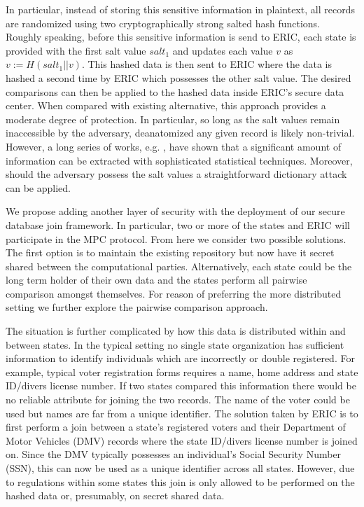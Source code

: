 In particular, instead of storing this sensitive information in plaintext, all records are randomized using two cryptographically strong salted hash functions. Roughly speaking, before this sensitive information is send to ERIC, each state is provided with the first salt value $salt_1$ and updates each value $v$ as $v := H(salt_1 || v)$. This hashed data is then sent to ERIC where the data is hashed a second time by ERIC which possesses the other salt value. The desired comparisons can then be applied to the hashed data inside ERIC's secure data center. When compared with existing alternative, this approach provides a moderate degree of protection. In particular, so long as the salt values remain inaccessible by the adversary, deanatomized any given record is likely non-trivial. However, a long series of works, e.g. \cite{deanon0,deanon1,deanon2,deanon3,deanon4}, have shown that a significant amount of information can be extracted with sophisticated statistical techniques. Moreover, should the adversary possess the salt values a straightforward dictionary attack can be applied.

We propose adding another layer of security with the deployment of our secure database join framework. In particular, two or more of the states and ERIC will participate in the MPC protocol. From here we consider two possible solutions. The first option is to maintain the existing repository but now have it secret shared between the computational parties. Alternatively, each state could be the long term holder of their own data and the states perform all pairwise comparison amongst themselves. For reason of preferring the more distributed setting we further explore the pairwise comparison approach. 

The situation is further complicated by how this data is distributed within and between states. In the typical setting no single state organization has sufficient information to identify individuals which are incorrectly or double registered. For example, typical voter registration forms requires a name, home address and state ID/divers license number. If two states compared this information there would be no reliable attribute for joining the two records. The name of the voter could be used but names are far from a unique identifier. The solution taken by ERIC is to first perform a join between a state's registered voters and their Department of Motor Vehicles (DMV) records where the state ID/divers license number is joined on. Since the DMV typically possesses an individual's Social Security Number (SSN), this can now be used as a unique identifier across all states. However, due to regulations within some states this join is only allowed to be performed on the hashed data or, presumably, on secret shared data.

